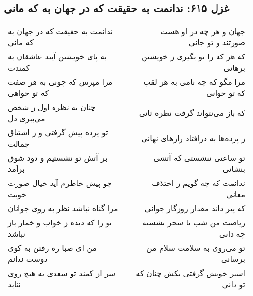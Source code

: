 \begin{center}
\section*{غزل ۶۱۵: ندانمت به حقیقت که در جهان به که مانی}
\label{sec:615}
\begin{longtable}{l p{0.5cm} r}
ندانمت به حقیقت که در جهان به که مانی
&&
جهان و هر چه در او هست صورتند و تو جانی
\\
به پای خویشتن آیند عاشقان به کمندت
&&
که هر که را تو بگیری ز خویشتن برهانی
\\
مرا مپرس که چونی به هر صفت که تو خواهی
&&
مرا مگو که چه نامی به هر لقب که تو خوانی
\\
چنان به نظره اول ز شخص می‌ببری دل
&&
که باز می‌نتواند گرفت نظره ثانی
\\
تو پرده پیش گرفتی و ز اشتیاق جمالت
&&
ز پرده‌ها به درافتاد رازهای نهانی
\\
بر آتش تو نشستیم و دود شوق برآمد
&&
تو ساعتی ننشستی که آتشی بنشانی
\\
چو پیش خاطرم آید خیال صورت خوبت
&&
ندانمت که چه گویم ز اختلاف معانی
\\
مرا گناه نباشد نظر به روی جوانان
&&
که پیر داند مقدار روزگار جوانی
\\
تو را که دیده ز خواب و خمار باز نباشد
&&
ریاضت من شب تا سحر نشسته چه دانی
\\
من ای صبا ره رفتن به کوی دوست ندانم
&&
تو می‌روی به سلامت سلام من برسانی
\\
سر از کمند تو سعدی به هیچ روی نتابد
&&
اسیر خویش گرفتی بکش چنان که تو دانی
\\
\end{longtable}
\end{center}
